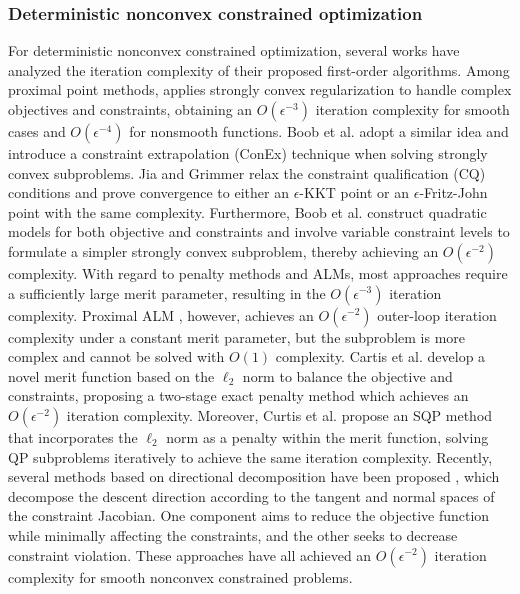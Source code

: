 \documentclass[11pt]{article}
\begin{document}
\subsubsection*{Deterministic nonconvex constrained optimization}
For deterministic nonconvex constrained optimization, {several works have analyzed the iteration complexity of their proposed first-order algorithms.}
{Among proximal point methods,} \cite{ma2020quadratically}  
{applies strongly convex regularization to handle complex objectives and constraints,} 
obtaining an \(O(\epsilon^{-3})\) {iteration} complexity for smooth cases and \(O(\epsilon^{-4})\) for nonsmooth functions. Boob et al. \cite{boob2023stochastic} adopt a similar idea and introduce a constraint extrapolation (ConEx) technique when solving strongly convex subproblems. Jia and Grimmer \cite{jia2025first} relax the constraint qualification (CQ) conditions and prove convergence to either an \(\epsilon\)-KKT point or an \(\epsilon\)-Fritz-John point {with} the same complexity. Furthermore, Boob et al. \cite{boob2025level} construct  quadratic models for both  objective and constraints and involve variable constraint levels to formulate a simpler strongly convex subproblem, thereby achieving an \(O(\epsilon^{-2})\) complexity. 
{With regard to} penalty methods and ALMs, most approaches \cite{li2021rate,lu2022single,lin2022complexity} require a sufficiently large merit parameter, resulting in the \(O(\epsilon^{-3})\) {iteration} complexity. 
Proximal ALM \cite{xie2021complexity}, however, {achieves an \(O(\epsilon^{-2})\) outer-loop iteration complexity} under a constant merit parameter, but the subproblem is more complex and cannot be solved with \(O(1)\) complexity. 
Cartis et al. \cite{cartis2017corrigendum} develop a novel merit function based on the \(\ell_2\) norm to balance the objective and constraints, proposing a two-stage exact penalty method {which achieves an \(O(\epsilon^{-2})\) iteration complexity.} Moreover, Curtis et al. \cite{curtis2024worst} propose an SQP method that incorporates the \(\ell_2\) norm as a penalty within the merit function, solving QP subproblems iteratively to achieve the same iteration complexity. 
{Recently, several methods based on directional decomposition have been proposed \cite{gratton2025simple,schechtman2023orthogonal}, which decompose the descent direction according to the tangent and normal spaces of the constraint Jacobian. One component aims to reduce the objective function while minimally affecting the constraints, and the other seeks to decrease constraint violation. These approaches have all achieved an \(O(\epsilon^{-2})\) iteration complexity for smooth nonconvex constrained problems.}
\end{document}
